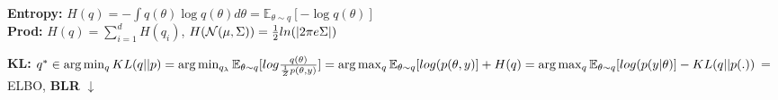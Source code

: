 \textbf{Entropy:} $H(q) = - \int q(\theta) \log q(\theta) d\theta = \mathbb{E}_{\theta \sim q} [-\log q(\theta)]$\\
\textbf{Prod:} $H(q) = \sum_{i=1}^d H(q_i)$, $H(\mathcal{N}(\mu, \Sigma)) = \frac{1}{2} ln(|2 \pi e \Sigma|)$\\
\begin{comment}
	\textbf{Diagonal Gaussian:} $H(\cN) = \frac{1}{2} ln(|2 \pi e \Sigma|) = \frac{1}{2} ln(2\pi e) + \sum_i^d ln(\sigma_i)$\\
\end{comment}

\textbf{KL:} $q^* \in \arg \min_q KL(q||p) = \arg \min_{q_\lambda} \mathbb{E}_{\theta \sim q}[log \frac{q(\theta)}{\frac{1}{Z	} p(\theta, y)}]\\
= \arg \max_q \mathbb{E}_{\theta \sim q}[log(p(\theta, y)] + H(q)\\
= \arg \max_q \mathbb{E}_{\theta \sim q}[log(p(y|\theta)] - KL(q||p(.))$ = ELBO, \textbf{BLR} $\downarrow$\\

\begin{comment}
	Derivation: $q^* \in \arg \min_q KL(q||p) = \arg \min_q \mathbb{E}_{\theta \sim q}[log \frac{q(\theta)}{\frac{1}{Z	} p(\theta, y)}] \\
	= \arg \min_q \mathbb{E}_{\theta \sim q}[log (q(\theta)) + log(Z)- log(p(\theta, y)] \\
= \arg \min_q \mathbb{E}_{\theta \sim q}[- log(p(\theta, y)] + \mathbb{E} [log(Z)] - \mathbb{E} [-log (q(\theta))] \\
= \arg \max_q \mathbb{E}_{\theta \sim q}[log(p(\theta, y)] + H(q)\\
= \arg \max_q \mathbb{E}_{\theta \sim q}[log(p(y|\theta) + log(p(\theta)) - log(q(\theta))] \\
= \arg \max_q \mathbb{E}_{\theta \sim q}[log(p(y|\theta)] - KL(q||p(.))$\\\
\textbf{Note:} The KL at the bottom is directed at the prior, not the posterior anymore.\\
\textbf{Interpretation 1:} We want function q that maximizes the joint probabilty, but has high uncertainty where we don't have data.\\
\textbf{Interpretation 2:} We want to maximize the likelihood of the data, but stay as close to the prior as possible. It acts like a regulation term, otherwise we would get MLE.\\
In MLE we would optimize over d dimensions, if we have a diagonal Gaussian, the ELBO would optimise the means and variances, e.g. 2d dimensions.\\
\end{comment}

